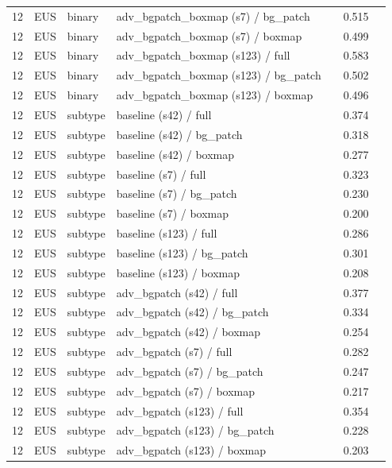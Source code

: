 \begin{longtable}{cL{1.1cm}L{1.5cm}L{5.6cm}ccc}
12 & EUS & binary & adv\_bgpatch\_boxmap (s7) / bg\_patch & \nl{} & 0.515 & \nl{} \\
12 & EUS & binary & adv\_bgpatch\_boxmap (s7) / boxmap & \nl{} & 0.499 & \nl{} \\
12 & EUS & binary & adv\_bgpatch\_boxmap (s123) / full & \nl{} & 0.583 & \nl{} \\
12 & EUS & binary & adv\_bgpatch\_boxmap (s123) / bg\_patch & \nl{} & 0.502 & \nl{} \\
12 & EUS & binary & adv\_bgpatch\_boxmap (s123) / boxmap & \nl{} & 0.496 & \nl{} \\
12 & EUS & subtype & baseline (s42) / full & \nl{} & 0.374 & \nl{} \\
12 & EUS & subtype & baseline (s42) / bg\_patch & \nl{} & 0.318 & \nl{} \\
12 & EUS & subtype & baseline (s42) / boxmap & \nl{} & 0.277 & \nl{} \\
12 & EUS & subtype & baseline (s7) / full & \nl{} & 0.323 & \nl{} \\
12 & EUS & subtype & baseline (s7) / bg\_patch & \nl{} & 0.230 & \nl{} \\
12 & EUS & subtype & baseline (s7) / boxmap & \nl{} & 0.200 & \nl{} \\
12 & EUS & subtype & baseline (s123) / full & \nl{} & 0.286 & \nl{} \\
12 & EUS & subtype & baseline (s123) / bg\_patch & \nl{} & 0.301 & \nl{} \\
12 & EUS & subtype & baseline (s123) / boxmap & \nl{} & 0.208 & \nl{} \\
12 & EUS & subtype & adv\_bgpatch (s42) / full & \nl{} & 0.377 & \nl{} \\
12 & EUS & subtype & adv\_bgpatch (s42) / bg\_patch & \nl{} & 0.334 & \nl{} \\
12 & EUS & subtype & adv\_bgpatch (s42) / boxmap & \nl{} & 0.254 & \nl{} \\
12 & EUS & subtype & adv\_bgpatch (s7) / full & \nl{} & 0.282 & \nl{} \\
12 & EUS & subtype & adv\_bgpatch (s7) / bg\_patch & \nl{} & 0.247 & \nl{} \\
12 & EUS & subtype & adv\_bgpatch (s7) / boxmap & \nl{} & 0.217 & \nl{} \\
12 & EUS & subtype & adv\_bgpatch (s123) / full & \nl{} & 0.354 & \nl{} \\
12 & EUS & subtype & adv\_bgpatch (s123) / bg\_patch & \nl{} & 0.228 & \nl{} \\
12 & EUS & subtype & adv\_bgpatch (s123) / boxmap & \nl{} & 0.203 & \nl{} \\

\end{longtable}
